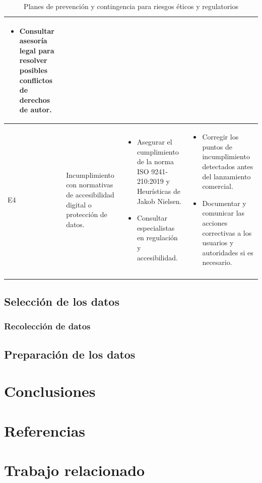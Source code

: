 \begin{longtable}{|>{\centering\arraybackslash}p{0.8cm}|>{\raggedright\arraybackslash}p{3.5cm}|>{\raggedright\arraybackslash}p{5.1cm}|>{\raggedright\arraybackslash}p{5.1cm}|}
\begin{itemize}
		\item Consultar asesoría legal para resolver posibles conflictos de derechos de autor.
	\end{itemize} \\
	\hline
	E4 & Incumplimiento con normativas de accesibilidad digital o protección de datos. &
	\begin{itemize}
		\item Asegurar el cumplimiento de la norma ISO 9241-210:2019 y Heurísticas de Jakob Nielsen.
		\item Consultar especialistas en regulación y accesibilidad.
	\end{itemize} &
	\begin{itemize}
		\item Corregir los puntos de incumplimiento detectados antes del lanzamiento comercial.
		\item Documentar y comunicar las acciones correctivas a los usuarios y autoridades si es necesario.
	\end{itemize} \\
	\hline
\caption{Planes de prevención y contingencia para riesgos éticos y regulatorios} \label{tab:riesgos_eticos} \\
\end{longtable}


\section{Selección de los datos}
\subsection{Recolección de datos}

\section{Preparación de los datos}

\chapter{Conclusiones}

\chapter{Referencias}


\chapter{Trabajo relacionado}

